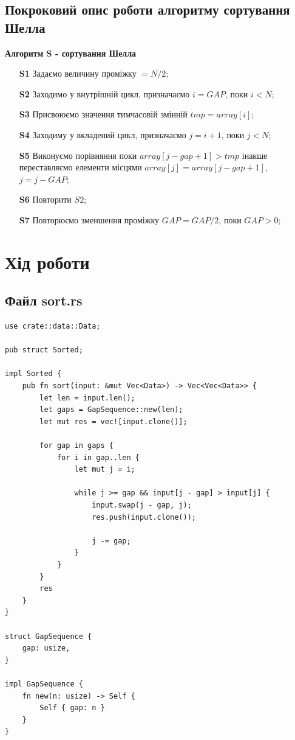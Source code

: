 \documentclass{article}
\begin{document}
\begin{normalsize}
		
		\subsection*{Покроковий опис роботи алгоритму сортування Шелла}
		\textbf{Алгоритм S - сортування Шелла}
		\begin{enumerate}
			\item [\textbf{S1}] Задаємо величину проміжку $= N/2$;
			\item [\textbf{S2}] Заходимо у внутрішній цикл, призначаємо $i = GAP$, поки $i < N$;
			\item [\textbf{S3}] Присвоюємо значення тимчасовій змінній $tmp=array[i]$;
			\item [\textbf{S4}] Заходиму у вкладений цикл, призначаємо $j=i+1$, поки $j<N$;
			\item [\textbf{S5}] Виконуємо порівняння поки $array[j-gap+1]>tmp$ інакше переставляємо елементи місцями $array[j]=array[j-gap+1]$, $j=j-GAP$;
			\item [\textbf{S6}] Повторити $S2$;
			\item [\textbf{S7}] Повторюємо зменшення проміжку $GAP=GAP/2$, поки $GAP > 0 $;
		\end{enumerate}
		
		\newpage
		
		\section*{Хід роботи}
		\subsection*{Файл sort.rs}
		\begin{lstlisting}
use crate::data::Data;

pub struct Sorted;

impl Sorted {
	pub fn sort(input: &mut Vec<Data>) -> Vec<Vec<Data>> {
		let len = input.len();
		let gaps = GapSequence::new(len);
		let mut res = vec![input.clone()];
		
		for gap in gaps {
			for i in gap..len {
				let mut j = i;
				
				while j >= gap && input[j - gap] > input[j] {
					input.swap(j - gap, j);
					res.push(input.clone());
					
					j -= gap;
				}
			}
		}
		res
	}
}

struct GapSequence {
	gap: usize,
}

impl GapSequence {
	fn new(n: usize) -> Self {
		Self { gap: n }
	}
}


\end{lstlisting}
\end{normalsize}
\end{document}

